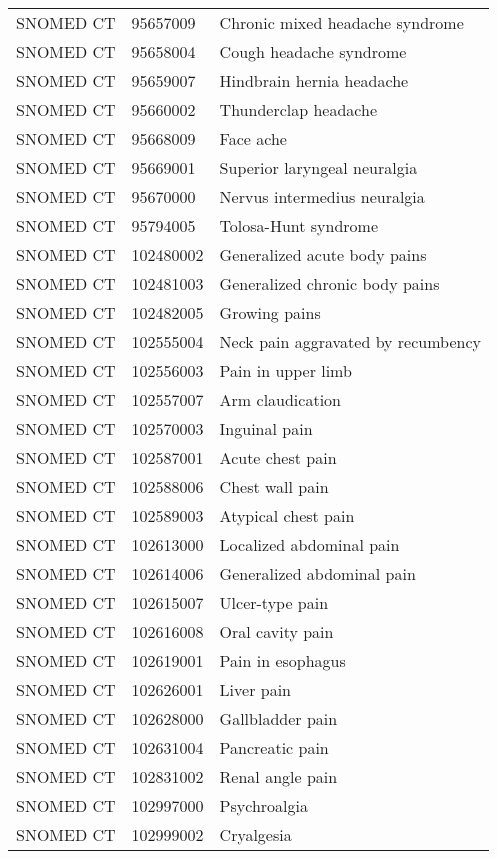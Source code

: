 \begin{longtable}{p{}p{}p{}}
  SNOMED CT & 95657009 & Chronic mixed headache syndrome \\ 
  SNOMED CT & 95658004 & Cough headache syndrome \\ 
  SNOMED CT & 95659007 & Hindbrain hernia headache \\ 
  SNOMED CT & 95660002 & Thunderclap headache \\ 
  SNOMED CT & 95668009 & Face ache \\ 
  SNOMED CT & 95669001 & Superior laryngeal neuralgia \\ 
  SNOMED CT & 95670000 & Nervus intermedius neuralgia \\ 
  SNOMED CT & 95794005 & Tolosa-Hunt syndrome \\ 
  SNOMED CT & 102480002 & Generalized acute body pains \\ 
  SNOMED CT & 102481003 & Generalized chronic body pains \\ 
  SNOMED CT & 102482005 & Growing pains \\ 
  SNOMED CT & 102555004 & Neck pain aggravated by recumbency \\ 
  SNOMED CT & 102556003 & Pain in upper limb \\ 
  SNOMED CT & 102557007 & Arm claudication \\ 
  SNOMED CT & 102570003 & Inguinal pain \\ 
  SNOMED CT & 102587001 & Acute chest pain \\ 
  SNOMED CT & 102588006 & Chest wall pain \\ 
  SNOMED CT & 102589003 & Atypical chest pain \\ 
  SNOMED CT & 102613000 & Localized abdominal pain \\ 
  SNOMED CT & 102614006 & Generalized abdominal pain \\ 
  SNOMED CT & 102615007 & Ulcer-type pain \\ 
  SNOMED CT & 102616008 & Oral cavity pain \\ 
  SNOMED CT & 102619001 & Pain in esophagus \\ 
  SNOMED CT & 102626001 & Liver pain \\ 
  SNOMED CT & 102628000 & Gallbladder pain \\ 
  SNOMED CT & 102631004 & Pancreatic pain \\ 
  SNOMED CT & 102831002 & Renal angle pain \\ 
  SNOMED CT & 102997000 & Psychroalgia \\ 
  SNOMED CT & 102999002 & Cryalgesia \\ 

\end{longtable}
